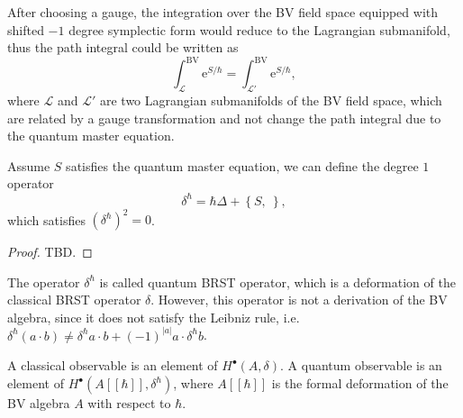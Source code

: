 \documentclass[10pt]{article}
\begin{document}
After choosing a gauge, the integration over the BV field space equipped with shifted $-1$ degree symplectic form would reduce to the Lagrangian submanifold, thus the path integral could be written as
\begin{equation*}
  \int _{\mathcal{L}}^{\mathrm{BV}} \mathrm{e}^{S / \hbar} = \int _{\mathcal{L}'}^{\mathrm{BV}} \mathrm{e}^{S / \hbar},
\end{equation*}
where $ \mathcal{L}$ and $ \mathcal{L}'$ are two Lagrangian submanifolds of the BV field space, which are related by a gauge transformation and not change the path integral due to the quantum master equation.

Assume $ S$ satisfies the quantum master equation, we can define the degree $ 1$ operator
\begin{equation*}
  \delta^{\hbar} = \hbar \Delta + \left\{ S, ~ \right\},
\end{equation*}
which satisfies $ ( \delta^{\hbar} )^{2} = 0$.
\begin{proof}
  TBD.
\end{proof}
The operator $ \delta^{\hbar}$ is called quantum BRST operator, which is a deformation of the classical BRST operator $ \delta$.
However, this operator is not a derivation of the BV algebra, since it does not satisfy the Leibniz rule, i.e. $ \delta^{\hbar}(a \cdot b) \neq \delta^{\hbar} a \cdot b + (-1)^{\left| a \right|} a \cdot \delta^{\hbar} b$.

\begin{definition}[Observables]
  A classical observable is an element of $ H^{\bullet}(A, \delta)$. A quantum observable is an element of $ H^{\bullet}(A[[\hbar]], \delta^{\hbar})$, where $ A[[\hbar]]$ is the formal deformation of the BV algebra $ A$ with respect to $ \hbar$.
\end{definition}
\end{document}
